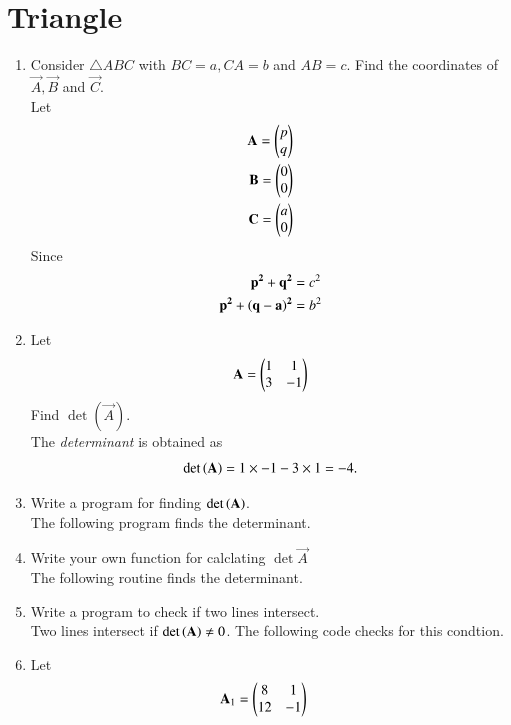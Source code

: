 \documentclass[journal,12pt,twocolumn]{IEEEtran}
\renewcommand\thesection{\arabic{section}}
\begin{document}
\section{Triangle}
\begin{enumerate}[label=\thesection.\arabic*
,ref=\thesection.\theenumi]
%
\item Consider $\triangle ABC$ with $BC = a, CA = b$ and $AB= c$.  Find the coordinates of $\vec{A}, \vec{B}$ 
and $\vec{C}$.
\\
\solution Let
\begin{align}
\label{eq:triangle_coord_def}
\mathbf{A}=\begin{pmatrix}p \\q\end{pmatrix}
\\
\mathbf{B}=\begin{pmatrix}0 \\0\end{pmatrix}
\\
\mathbf{C}=\begin{pmatrix}a \\0\end{pmatrix}
\end{align}
%
Since
\begin{align}
\label{eq:triangle_dist}
\mathbf{p^2+q^2}&= c^2
\\
\mathbf{p^2+\left(q-a\right)^2}&= b^2
\end{align}
\item Let 
\begin{align}
\label{eq:matrix_det}
\mathbf{A}= \begin{pmatrix}1 & 1 \\ 3 & -1\end{pmatrix}
\end{align}
Find $\det(\vec{A})$.
\\
\solution The {\em determinant} is obtained as
\begin{equation}
\det\left(\mathbf{A}\right) = 1 \times -1 - 3 \times 1 = -4.
\end{equation}
%
\item Write a program for finding $\det\left(\mathbf{A}\right)$.
\\
\solution The following program finds the determinant.

\item Write your own function for calclating $\det{\vec{A}}$
\\
\solution The following routine finds the determinant.

\item Write a program to check if two lines intersect.
\\
\solution Two lines intersect if $\det\left(\mathbf{A}\right) \ne 0$.  The following
code checks for this condtion.

\item Let
\begin{align}
\label{eq:matrix_cramer}
\vec{A}_1 &= \myvec{8 & 1 \\ 12 & -1}

\end{align}
\end{enumerate}
\end{document}
